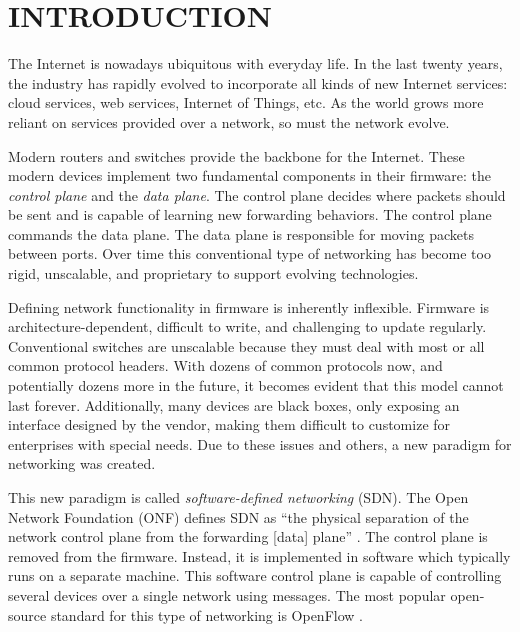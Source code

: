 \chapter{INTRODUCTION} \label{ch:intro}

%
%



The Internet is nowadays ubiquitous with everyday life. In the last twenty years,
the industry has rapidly evolved to incorporate all kinds of new Internet services:
cloud services, web services, Internet of Things, etc. As the world grows
more reliant on services provided over a network, so must the network evolve.

Modern routers and switches provide the backbone for the Internet.
These modern devices implement two fundamental components in their firmware: the
\emph{control plane} and the \emph{data plane}.
The control plane decides where packets should be sent and is capable of learning
new forwarding behaviors. The control plane commands the data plane.
The data plane is responsible for moving packets between ports.
Over time this conventional type of networking has become too rigid, unscalable, and
proprietary to support evolving technologies. 

Defining network functionality in firmware is inherently inflexible.
Firmware is architecture-dependent, difficult to write, and challenging to update
regularly.
Conventional switches are unscalable because they must deal with most or all
common protocol headers.
With dozens of common protocols now, and potentially dozens more in the future,
it becomes evident that this model cannot last forever.
Additionally, many devices are black boxes,
only exposing an interface designed by the vendor,
making them difficult to customize for enterprises with special needs.
Due to these issues and others,
a new paradigm for networking was created. 

This new paradigm
is called \textit{software-defined networking} (SDN). The Open Network
Foundation (ONF) defines SDN as ``the physical separation of the network control
plane from the forwarding [data] plane'' \cite{onf_sdn_def}.
The control plane is removed from the firmware.
Instead, it is implemented in software which typically runs on a separate machine.
This software control plane is capable of controlling several devices over a
single network using messages.
The most popular open-source standard for this type of networking is OpenFlow \cite{openflow_spec}.

